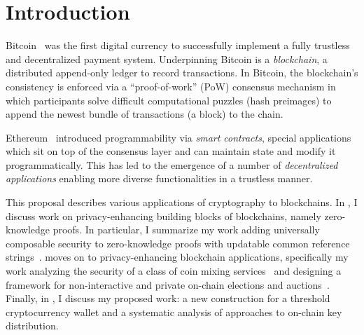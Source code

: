 \section{Introduction}

Bitcoin~\cite{bitcoin} was the first digital currency to successfully implement a fully trustless and decentralized payment system. Underpinning Bitcoin is a \emph{blockchain}, a distributed append-only ledger to record transactions. In Bitcoin, the blockchain's consistency is enforced via a ``proof-of-work'' (PoW) consensus mechanism in which participants solve difficult computational puzzles (hash preimages) to append the newest bundle of transactions (a block) to the chain. 

Ethereum~\cite{ethereum} introduced programmability via \emph{smart contracts}, special applications which sit on top of the consensus layer and can maintain state and modify it programmatically. This has led to the emergence of a number of \emph{decentralized applications} enabling more diverse functionalities in a trustless manner.

This proposal describes various applications of cryptography to blockchains. In , I discuss work on privacy-enhancing building blocks of blockchains, namely zero-knowledge proofs. In particular, I summarize my work adding universally composable security to zero-knowledge proofs with updatable common reference strings~\cite{CSF:AGRS24}.  moves on to privacy-enhancing blockchain applications, specifically my work analyzing the security of a class of coin mixing services~\cite{CCS:GMMMTT22} and designing a framework for non-interactive and private on-chain elections and auctions~\cite{EPRINT:GSZB23}. Finally, in , I discuss my proposed work: a new construction for a threshold cryptocurrency wallet and a systematic analysis of approaches to on-chain key distribution.




